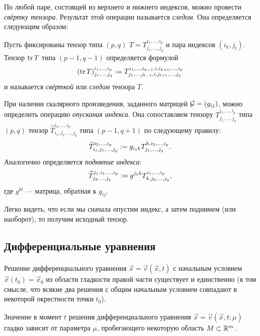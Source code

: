 По любой паре, состоящей из верхнего и нижнего индексов, можно провести \textit{свёртку тензора}. Результат этой операции называется \textit{следом}. Она определяется следующим образом:

\begin{definition}
	Пусть фиксированы тензор типа $(p, q)$ $T = T^{i_1, \ldots, i_p}_{j_1, \ldots, j_q}$ и пара индексов $(i_k, j_l)$. Тензор $\operatorname{tr} T$ типа $(p - 1, q - 1)$ определяется формулой
	\[
		(\operatorname{tr} T)^{i_1, \ldots, i_p}_{j_1, \ldots, j_q} \vcentcolon = T^{i_1, \ldots, i_{k - 1}, i, i_{k + 1}, \ldots, i_p}_{j_1, \ldots, j_{l - 1}, i, j_{l + 1}, \ldots, j_q}
	\]
	и называется \textit{свёрткой} или \textit{следом} тензора $T$.
\end{definition}

\begin{definition}
	При наличии скалярного произведения, заданного матрицей $\mathcal{G} = (g_{ij})$, можно определить операцию \textit{опускания индекса}. Она сопоставляем тензору $T^{i_1, \ldots, i_p}_{j_1, \ldots, j_q}$ типа $(p, q)$ тензор $\widehat{T}^{i_2, \ldots, i_p}_{i_1, j_1, \ldots, j_q}$ типа $(p - 1, q + 1)$ по следующему правилу:
	\[
		\widehat{T}^{i_2, \ldots, i_p}_{i_1, j_1, \ldots, j_q} \vcentcolon = g_{i_1k}T^{k, i_2, \ldots, i_p}_{j_1, \ldots, j_q}.
	\]
	Аналогично определяется \textit{поднятие индекса}:
	\[
		\widehat{T}^{j_1, i_1,\ldots, i_p}_{j_2, \ldots, j_q} \vcentcolon = g^{j_1k}T^{i_1, \ldots, i_p}_{k, j_2, \ldots, j_q},
	\]
	где $g^{kl}$ --- матрица, обратная к $g_{ij}$.
\end{definition}

Легко видеть, что если мы сначала опустим индекс, а затем поднимем (или наоборот), то получим исходный тензор.

\subsection{Дифференциальные уравнения}

\begin{theorem}
	Решение дифференциального уравнения $\dot{\vec{x}} = \vec{v}(\vec{x}, t)$ с начальным условием $\vec{x}(t_0) = \vec{x}_0$ из области гладкости правой части существует и единственно (в том смысле, что всякие два решения с общим начальным условием совпадают в некоторой окрестности точки $t_0$).
\end{theorem}

\begin{theorem}
	Значение в момент $t$ решения дифференциального уравнения $\dot{\vec{x}} = \vec{v}(\vec{x}, t; \mu)$ гладко зависит от параметра $\mu$, пробегающего некоторую область $M \subset \mathbb{R}^m$.
\end{theorem}

